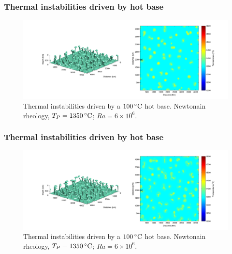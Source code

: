 \documentclass[aspectratio=169]{beamer}
\begin{document}
\begin{frame}
    \frametitle{Thermal instabilities driven by hot base}
    \begin{figure}
        \vspace{-.5cm}
        \includegraphics[width=0.85\paperwidth]{./figures/Newt100/dT1.0741_4x4_Newt_Ra6e6_3.png}
        \caption{Thermal instabilities driven by a $100\rm\,^{\circ}C$ hot base. Newtonain rheology, $T_{P}=1350\rm\,^{\circ}C$; $Ra = 6\times10^{6}$.}
    \end{figure}
\end{frame}

\begin{frame}
    \frametitle{Thermal instabilities driven by hot base}
    \begin{figure}
        \vspace{-.5cm}
        \includegraphics[width=0.85\paperwidth]{./figures/Newt100/dT1.0741_4x4_Newt_Ra6e6_4.png}
        \caption{Thermal instabilities driven by a $100\rm\,^{\circ}C$ hot base. Newtonain rheology, $T_{P}=1350\rm\,^{\circ}C$; $Ra = 6\times10^{6}$.}
    \end{figure}
\end{frame}
\end{document}
